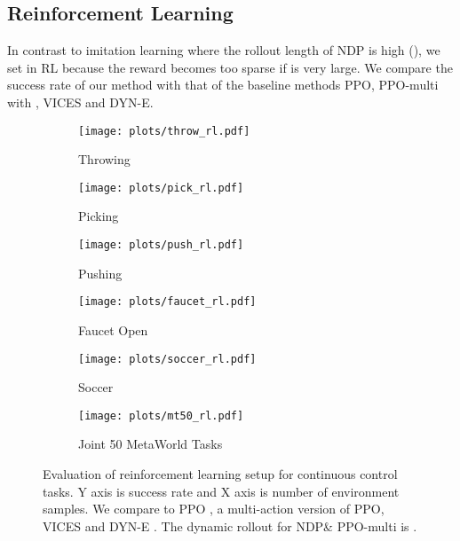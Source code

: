 \documentclass{article}
\newcommand{\our}{NDP\xspace}
\begin{document}
\subsection{Reinforcement Learning}
In contrast to imitation learning where the rollout length of \our is high (), we set  in RL because the reward becomes too sparse if  is very large. We compare the success rate of our method with that of the baseline methods PPO, PPO-multi with , VICES and DYN-E.

\begin{figure}[t!]
\centering
\begin{subfigure}[b]{0.32\linewidth}
    \texttt{[image: plots/throw\_rl.pdf]}
    \vspace{-0.26in}
    \caption{\small Throwing}
    \label{fig:throw-rl}
\end{subfigure}
\begin{subfigure}[b]{0.32\linewidth}
    \texttt{[image: plots/pick\_rl.pdf]}
    \vspace{-0.26in}
    \caption{\small Picking}
    \label{fig:pick-rl}
\end{subfigure}
\begin{subfigure}[b]{0.32\linewidth}
    \texttt{[image: plots/push\_rl.pdf]}
    \vspace{-0.26in}
    \caption{\small Pushing}
    \label{fig:push-rl}
\end{subfigure}
\begin{subfigure}[b]{0.32\linewidth}
    \texttt{[image: plots/faucet\_rl.pdf]}
    \vspace{-0.26in}
    \caption{\small Faucet Open}
    \label{fig:faucet-rl}
\end{subfigure}
\begin{subfigure}[b]{0.32\linewidth}
    \texttt{[image: plots/soccer\_rl.pdf]}
    \vspace{-0.26in}
    \caption{\small Soccer}
    \label{fig:soccer-rl}
\end{subfigure}
\begin{subfigure}[b]{0.32\linewidth}
    \texttt{[image: plots/mt50\_rl.pdf]}
    \vspace{-0.26in}
    \caption{\small Joint 50 MetaWorld Tasks}
    \label{fig:door-rl}
\end{subfigure}
\vspace{-0.01in}
\caption{\small Evaluation of reinforcement learning setup for continuous control tasks. Y axis is success rate and X axis is number of environment samples. We compare to PPO \cite{ppo}, a multi-action version of PPO, VICES \cite{vices2019martin} and DYN-E \cite{whitney2019dynamics}. The dynamic rollout for \our \& PPO-multi is .}
\vspace{-0.06in}
\label{fig:rl-results}
\end{figure}
\end{document}
